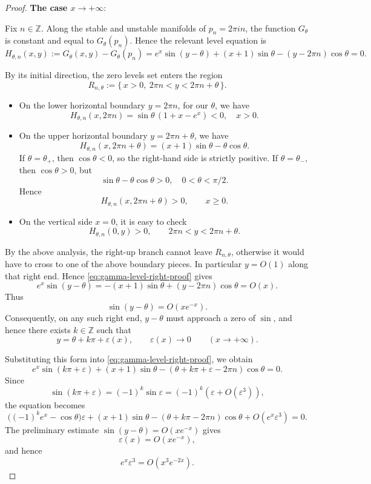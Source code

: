 \documentclass[10pt,a4paper]{amsart}
\begin{document}
\begin{proof} 
\noindent\textbf{The case $x\rightarrow+\infty$}:

Fix \(n\in\mathbb Z\).  Along the stable and unstable manifolds of
\(p_n=2\pi i n\), the function \(G_\theta\) is constant and equal to
\(G_\theta(p_n)\).  Hence the relevant level equation is
\begin{equation}\label{eq:gamma-level-right-proof}
H_{\theta,n}(x,y):=
G_\theta(x,y)-G_\theta(p_n)
=
e^x\sin(y-\theta)+(x+1)\sin\theta-(y-2\pi n)\cos\theta
=0 .
\end{equation}



By its initial direction, the zero levels set enters the region
\[
  R_{n,\theta}
  :=
  \{\,x>0,\ 2\pi n<y<2\pi n+\theta\,\}.
\]
\begin{itemize}
    \item On the lower horizontal boundary \(y=2\pi n\), for our $\theta$, we have
\[
  H_{\theta,n}(x,2\pi n)
  =
  \sin\theta\,(1+x-e^x)<0,\quad x>0.
\]
    \item On the upper horizontal boundary \(y=2\pi n+\theta\), we have
\[
  H_{\theta,n}(x,2\pi n+\theta)
  =
  (x+1)\sin\theta-\theta\cos\theta .
\]
If \(\theta=\theta_+\), then \(\cos\theta<0\), so the right-hand side is
strictly positive. If \(\theta=\theta_-\), then \(\cos\theta>0\), but
\[
  \sin\theta-\theta\cos\theta>0,\quad 0<\theta<\pi/2.
\] 
Hence
\[
  H_{\theta,n}(x,2\pi n+\theta)>0,
  \qquad x\geq 0 .
\]
\item On the  vertical side \(x=0\), it is easy to check 
\[
  H_{\theta,n}(0,y)>0,
  \qquad 2\pi n<y<2\pi n+\theta.
\]
\end{itemize}
By the above analysis, the right-up branch
cannot leave \(R_{n,\theta}\), otherwise it would have to cross to one of the above boundary pieces. In particular \(y=O(1)\)
along that right end. Hence
\eqref{eq:gamma-level-right-proof} gives
\[
e^x\sin(y-\theta)
=
-(x+1)\sin\theta+(y-2\pi n)\cos\theta
=
O(x).
\]
Thus
\[
\sin(y-\theta)=O(xe^{-x}).
\]
Consequently, on any such right end, \(y-\theta\) must approach a zero of
\(\sin\), and hence there exists \(k\in\mathbb Z\) such that
\[
y=\theta+k\pi+\varepsilon(x),
\qquad
\varepsilon(x)\to 0
\qquad
(x\to+\infty).
\]

Substituting this form into \eqref{eq:gamma-level-right-proof}, we obtain
\[
e^x\sin(k\pi+\varepsilon)
+(x+1)\sin\theta
-(\theta+k\pi+\varepsilon-2\pi n)\cos\theta
=0.
\]
Since
\[
\sin(k\pi+\varepsilon)=(-1)^k\sin\varepsilon
=
(-1)^k\left(\varepsilon+O(\varepsilon^3)\right),
\]
the equation becomes
\[
\bigl((-1)^k e^x-\cos\theta\bigr)\varepsilon
+
(x+1)\sin\theta
-
(\theta+k\pi-2\pi n)\cos\theta
+
O(e^x\varepsilon^3)
=0.
\]
The preliminary estimate \(\sin(y-\theta)=O(xe^{-x})\) gives
\[
\varepsilon(x)=O(xe^{-x}),
\]
and hence
\[
e^x\varepsilon^3=O(x^3e^{-2x}).
\]


\end{proof}
\end{document}
